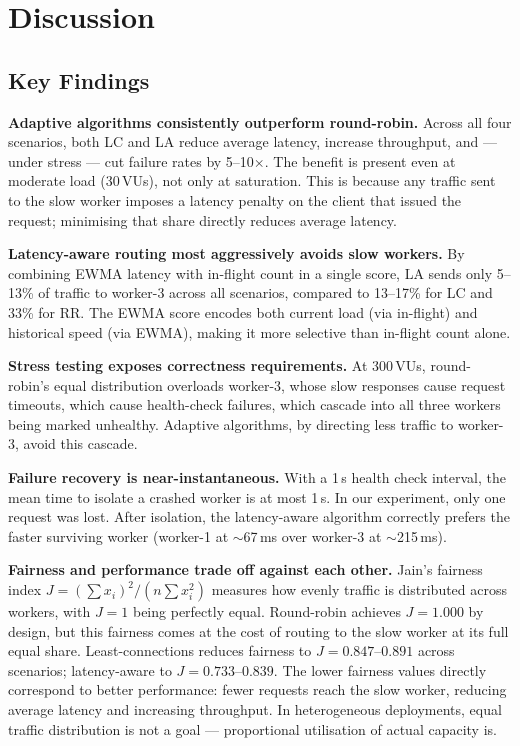 \documentclass[conference]{IEEEtran}
\begin{document}
\section{Discussion}

\subsection{Key Findings}

\textbf{Adaptive algorithms consistently outperform round-robin.}
Across all four scenarios, both LC and LA reduce average latency,
increase throughput, and --- under stress --- cut failure rates by
5--10$\times$. The benefit is present even at moderate load (30\,VUs),
not only at saturation. This is because any traffic sent to the slow
worker imposes a latency penalty on the client that issued the request;
minimising that share directly reduces average latency.

\textbf{Latency-aware routing most aggressively avoids slow workers.}
By combining EWMA latency with in-flight count in a single score, LA
sends only 5--13\% of traffic to worker-3 across all scenarios, compared
to 13--17\% for LC and 33\% for RR. The EWMA score encodes both current
load (via in-flight) and historical speed (via EWMA), making it more
selective than in-flight count alone.

\textbf{Stress testing exposes correctness requirements.} At 300\,VUs,
round-robin's equal distribution overloads worker-3, whose slow
responses cause request timeouts, which cause health-check failures,
which cascade into all three workers being marked unhealthy. Adaptive
algorithms, by directing less traffic to worker-3, avoid this cascade.

\textbf{Failure recovery is near-instantaneous.} With a 1\,s health
check interval, the mean time to isolate a crashed worker is at most
1\,s. In our experiment, only one request was lost. After isolation,
the latency-aware algorithm correctly prefers the faster surviving
worker (worker-1 at $\sim$67\,ms over worker-3 at $\sim$215\,ms).

\textbf{Fairness and performance trade off against each other.}
Jain's fairness index $J = (\sum x_i)^2 / (n \sum x_i^2)$ measures
how evenly traffic is distributed across workers, with $J=1$ being
perfectly equal. Round-robin achieves $J=1.000$ by design, but this
fairness comes at the cost of routing to the slow worker at its full
equal share. Least-connections reduces fairness to $J=0.847$--$0.891$
across scenarios; latency-aware to $J=0.733$--$0.839$. The lower
fairness values directly correspond to better performance: fewer
requests reach the slow worker, reducing average latency and
increasing throughput. In heterogeneous deployments, equal traffic
distribution is not a goal --- proportional utilisation of actual
capacity is.
\end{document}
